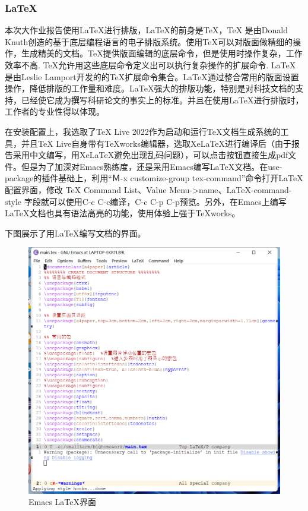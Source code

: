 \documentclass[a4paper]{article}
\begin{document}
            \subsubsection{LaTeX}
  本次大作业报告使用LaTeX进行排版，LaTeX的前身是TeX，TeX 是由Donald Knuth创造的基于底层编程语言的电子排版系统。使用TeX可以对版面做精细的操作，生成精美的文档。TeX提供版面编辑的底层命令，但是使用时操作复杂，工作效率不高. TeX允许用这些底层命令定义出可以执行复杂操作的扩展命令. LaTeX是由Leslie Lamport开发的的TeX扩展命令集合。LaTeX通过整合常用的版面设置操作，降低排版的工作量和难度。LaTeX强大的排版功能，特别是对科技文档的支持，已经使它成为撰写科研论文的事实上的标准。并且在使用LaTeX进行排版时，工作者的专业性得以体现。 \par
  在安装配置上，我选取了TeX Live 2022作为启动和运行TeX文档生成系统的工具，并且TeX Live自身带有TeXworks编辑器，选取XeLaTeX进行编译后（由于报告采用中文编写，用XeLaTeX避免出现乱码问题），可以点击按钮直接生成pdf文件。但是为了加深对Emacs熟练度，还是采用Emacs编写LaTeX文档。在use-package的插件基础上，利用“Ｍ-x customize-group tex-command”命令打开LaTeX配置界面，修改 TeX Command List、Value Menu->name、LaTeX-command-style 字段就可以使用C-c C-c编译，C-c C-p C-p预览。另外，在Emacs上编写LaTeX文档也具有语法高亮的功能，使用体验上强于TeXworks。 \par
  下图展示了用LaTeX编写文档的界面。 \par
    \begin{figure}[H]
                \centering
                \includegraphics[width=16cm]{images/Emacs Latex.png}
                \caption{Emacs LaTeX界面}
                \label{fig1}
              \end{figure}
\end{document}
